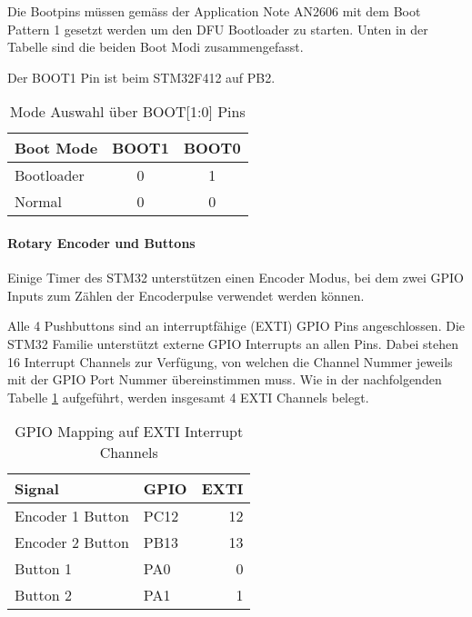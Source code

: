 Die Bootpins müssen gemäss der Application Note AN2606 \cite[Table 2]{AN2606} mit dem Boot Pattern 1 gesetzt werden um den DFU Bootloader zu starten.
Unten in der Tabelle sind die beiden Boot Modi zusammengefasst.

Der BOOT1 Pin ist beim STM32F412 auf PB2.

\begin{table}[H]
\centering
\begin{tabular}{|l|c|c|}
\hline
\textbf{Boot Mode} & \textbf{BOOT1} & \textbf{BOOT0} \\ \hline
Bootloader         & 0              & 1              \\ \hline
Normal             & 0              & 0              \\ \hline
\end{tabular}
\caption{Mode Auswahl über BOOT[1:0] Pins}
\end{table}


\paragraph{Rotary Encoder und Buttons}

Einige Timer des STM32 unterstützen einen Encoder Modus, bei dem zwei GPIO Inputs zum Zählen der Encoderpulse verwendet werden können.

Alle 4 Pushbuttons sind an interruptfähige (EXTI) GPIO Pins angeschlossen. 
Die STM32 Familie unterstützt externe GPIO Interrupts an allen Pins. 
Dabei stehen 16 Interrupt Channels zur Verfügung, von welchen die Channel Nummer jeweils mit der GPIO Port Nummer übereinstimmen muss. 
Wie in der nachfolgenden Tabelle \ref{tab:EXTIPins} aufgeführt, werden insgesamt 4 EXTI Channels belegt.

\begin{table}[H]
	\centering
	\begin{tabular}{|l|l|r|}
	\hline
	\textbf{Signal}  & \textbf{GPIO} & \textbf{EXTI} \\ \hline
	Encoder 1 Button & PC12          & 12            \\ \hline
	Encoder 2 Button & PB13          & 13            \\ \hline
	Button 1         & PA0           & 0             \\ \hline
	Button 2         & PA1           & 1             \\ \hline
	\end{tabular}
	\caption{GPIO Mapping auf EXTI Interrupt Channels}
	\label{tab:EXTIPins}
\end{table}





